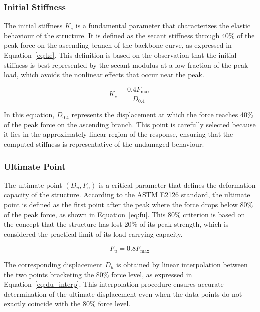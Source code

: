 \documentclass[11pt,a4paper]{article}
\begin{document}
\subsubsection{Initial Stiffness}

The initial stiffness \(K_e\) is a fundamental parameter that characterizes the elastic behaviour of the structure. It is defined as the secant stiffness through 40\% of the peak force on the ascending branch of the backbone curve, as expressed in Equation~\ref{eq:ke}. This definition is based on the observation that the initial stiffness is best represented by the secant modulus at a low fraction of the peak load, which avoids the nonlinear effects that occur near the peak.

\begin{equation}
K_e = \frac{0.4 F_{\max}}{D_{0.4}}
\label{eq:ke}
\end{equation}

In this equation, \(D_{0.4}\) represents the displacement at which the force reaches 40\% of the peak force on the ascending branch. This point is carefully selected because it lies in the approximately linear region of the response, ensuring that the computed stiffness is representative of the undamaged behaviour.

\subsubsection{Ultimate Point}

The ultimate point \((D_u, F_u)\) is a critical parameter that defines the deformation capacity of the structure. According to the ASTM E2126 standard, the ultimate point is defined as the first point after the peak where the force drops below 80\% of the peak force, as shown in Equation~\ref{eq:fu}. This 80\% criterion is based on the concept that the structure has lost 20\% of its peak strength, which is considered the practical limit of its load-carrying capacity.

\begin{equation}
F_u = 0.8 F_{\max}
\label{eq:fu}
\end{equation}

The corresponding displacement \(D_u\) is obtained by linear interpolation between the two points bracketing the 80\% force level, as expressed in Equation~\ref{eq:du_interp}. This interpolation procedure ensures accurate determination of the ultimate displacement even when the data points do not exactly coincide with the 80\% force level.
\end{document}
